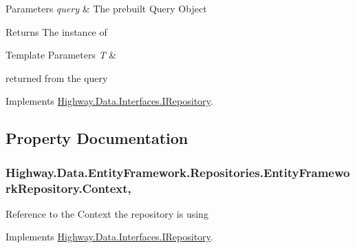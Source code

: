 \begin{DoxyParams}{Parameters}
{\em query} & The prebuilt Query Object\\
\hline
\end{DoxyParams}
\begin{DoxyReturn}{Returns}
The instance of 
\begin{DoxyTemplParams}{Template Parameters}
{\em T} & \\
\hline
\end{DoxyTemplParams}
returned from the query
\end{DoxyReturn}


Implements \hyperlink{interface_highway_1_1_data_1_1_interfaces_1_1_i_repository_af4256e7e2f82fd545161eeedd323712b}{Highway.\-Data.\-Interfaces.\-I\-Repository}.



\subsection{Property Documentation}
\hypertarget{class_highway_1_1_data_1_1_entity_framework_1_1_repositories_1_1_entity_framework_repository_a39447e7deb1284fc5e5d9ea7c2c78c63}{
\subsubsection[{Context}]{ Highway.\-Data.\-Entity\-Framework.\-Repositories.\-Entity\-Framework\-Repository.\-Context\hspace{0.3cm}{\ttfamily [get]}, {\ttfamily [set]}}}\label{class_highway_1_1_data_1_1_entity_framework_1_1_repositories_1_1_entity_framework_repository_a39447e7deb1284fc5e5d9ea7c2c78c63}


Reference to the Context the repository is using 



Implements \hyperlink{interface_highway_1_1_data_1_1_interfaces_1_1_i_repository_aadf2e3d1d5b118f2fe6e2b1fc1ae8e77}{Highway.\-Data.\-Interfaces.\-I\-Repository}.

